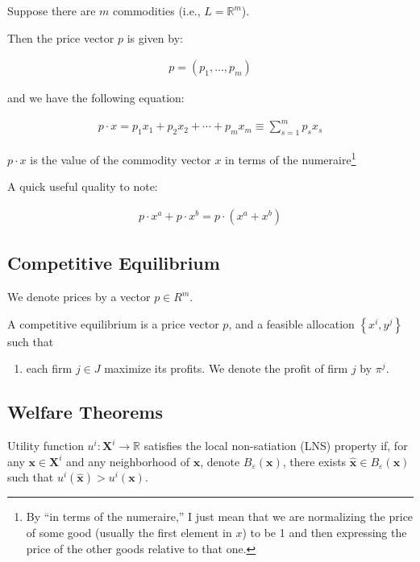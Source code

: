 \documentclass[10pt]{article}
\begin{document}
Suppose there are $m$ commodities (i.e., $L = \mathbb{R}^m$).

Then the price vector $p$ is given by:

\begin{align}
    p=\left(p_1, \ldots, p_m\right)
\end{align}

and we have the following equation:

\begin{align}
    p \cdot x=p_1 x_1+p_2 x_2+\cdots+p_m x_m \equiv \sum_{s=1}^m p_s x_s
\end{align}

$p \cdot x$ is the value of the commodity vector $x$
in terms of the numeraire\footnote{By ``in terms of the numeraire,''
I just mean that we are normalizing the price of some good (usually the first 
element in $x$) to be 1 and 
then expressing the price of the other goods relative to that one.}

A quick useful quality to note:

\begin{align}
    p \cdot x^a+p \cdot x^b=p \cdot\left(x^a+x^b\right)
\end{align}

\subsection{Competitive Equilibrium}

\begin{definition} 
    We denote prices by a vector $p \in R^m$. 
    
    A competitive equilibrium is a price vector $p$, and a feasible allocation 
    $\left\{x^i, y^j\right\}$ such that

    \begin{enumerate}
        \item each firm $j \in J$ maximize its profits. We denote the profit of firm $j$ by $\pi^j$.
    \end{enumerate}

\end{definition}

\subsection{Welfare Theorems}

\begin{definition} 
    Utility function $u^i: \mathbf{X}^i \rightarrow \mathbb{R}$ satisfies the 
    local non-satiation (LNS) property if, for any 
    $\mathbf{x} \in \mathbf{X}^i$ and any neighborhood of 
    $\mathbf{x}$, denote $B_{\varepsilon}(\mathbf{x})$, there 
    exists $\hat{\mathbf{x}} \in B_{\varepsilon}(\mathbf{x})$ 
    such that $u^i(\hat{\mathbf{x}})>u^i(\mathbf{x})$.
\end{definition}
\end{document}
